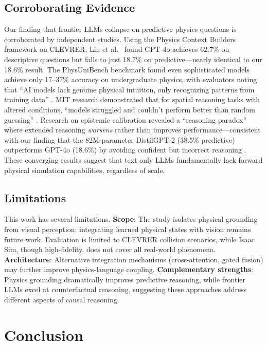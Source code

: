 \documentclass[conference]{IEEEtran}
\theoremstyle{plain}
\theoremstyle{definition}
\theoremstyle{remark}
\begin{document}
\subsection{Corroborating Evidence}

Our finding that frontier LLMs collapse on predictive physics questions is corroborated by independent studies. Using the Physics Context Builders framework on CLEVRER, Lin et al.\ \cite{lin2024physics} found GPT-4o achieves 62.7\% on descriptive questions but falls to just 18.7\% on predictive---nearly identical to our 18.6\% result. The PhysUniBench benchmark found even sophisticated models achieve only 17--37\% accuracy on undergraduate physics, with evaluators noting that ``AI models lack genuine physical intuition, only recognizing patterns from training data'' \cite{wang2024physunibench}. MIT research demonstrated that for spatial reasoning tasks with altered conditions, ``models struggled and couldn't perform better than random guessing'' \cite{dziri2024faith}. Research on epistemic calibration revealed a ``reasoning paradox'' where extended reasoning \emph{worsens} rather than improves performance---consistent with our finding that the 82M-parameter DistilGPT-2 (38.5\% predictive) outperforms GPT-4o (18.6\%) by avoiding confident but incorrect reasoning \cite{shojaee2024calibration}. These converging results suggest that text-only LLMs fundamentally lack forward physical simulation capabilities, regardless of scale.

\subsection{Limitations}

This work has several limitations. \textbf{Scope}: The study isolates physical grounding from visual perception; integrating learned physical states with vision remains future work. Evaluation is limited to CLEVRER collision scenarios, while Isaac Sim, though high-fidelity, does not cover all real-world phenomena. \textbf{Architecture}: Alternative integration mechanisms (cross-attention, gated fusion) may further improve physics-language coupling. \textbf{Complementary strengths}: Physics grounding dramatically improves predictive reasoning, while frontier LLMs excel at counterfactual reasoning, suggesting these approaches address different aspects of causal reasoning.

\section{Conclusion}
\label{sec:conclusion}
\end{document}
